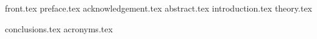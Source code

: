 \documentclass[12pt,twoside,openright,final]{report}
\begin{document}
{front.tex}
\setcounter{page}{0}
{preface.tex}
{acknowledgement.tex}
{abstract.tex}
\listoftodos %
\tableofcontents
\setcounter{page}{0}
{introduction.tex}
{theory.tex}



{conclusions.tex}
\appendix
{acronyms.tex}




\end{document}

